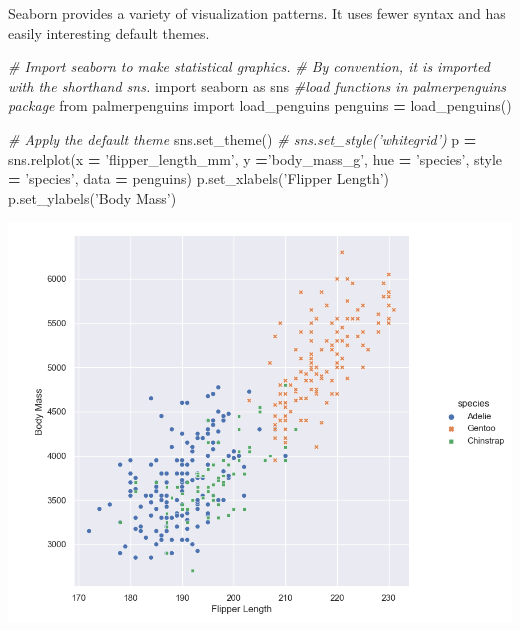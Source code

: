 \documentclass[]{book}
\newenvironment{Shaded}{\begin{snugshade}}{\end{snugshade}}
\newcommand{\CommentTok}[1]{\textcolor[rgb]{0.56,0.35,0.01}{\textit{#1}}}
\newcommand{\ImportTok}[1]{#1}
\newcommand{\NormalTok}[1]{#1}
\newcommand{\OperatorTok}[1]{\textcolor[rgb]{0.81,0.36,0.00}{\textbf{#1}}}
\newcommand{\StringTok}[1]{\textcolor[rgb]{0.31,0.60,0.02}{#1}}
\begin{document}
Seaborn provides a variety of visualization patterns. It uses fewer syntax and has easily interesting default themes.

\begin{Shaded}
\begin{Highlighting}[]
\CommentTok{# Import seaborn to make statistical graphics. }
\CommentTok{# By convention, it is imported with the shorthand sns.}
\ImportTok{import}\NormalTok{ seaborn }\ImportTok{as}\NormalTok{ sns }
\CommentTok{#load functions in palmerpenguins package}
\ImportTok{from}\NormalTok{ palmerpenguins }\ImportTok{import}\NormalTok{ load_penguins}
\NormalTok{penguins }\OperatorTok{=}\NormalTok{ load_penguins()}

\CommentTok{# Apply the default theme}
\NormalTok{sns.set_theme()}
\CommentTok{# sns.set_style('whitegrid')}
\NormalTok{p }\OperatorTok{=}\NormalTok{ sns.relplot(x }\OperatorTok{=} \StringTok{'flipper_length_mm'}\NormalTok{,}
\NormalTok{            y }\OperatorTok{=}\StringTok{'body_mass_g'}\NormalTok{,}
\NormalTok{            hue }\OperatorTok{=} \StringTok{'species'}\NormalTok{,}
\NormalTok{            style }\OperatorTok{=} \StringTok{'species'}\NormalTok{,}
\NormalTok{            data }\OperatorTok{=}\NormalTok{ penguins)}
\NormalTok{p.set_xlabels(}\StringTok{'Flipper Length'}\NormalTok{)}
\NormalTok{p.set_ylabels(}\StringTok{'Body Mass'}\NormalTok{)   }
\end{Highlighting}
\end{Shaded}

\begin{center}\includegraphics[width=0.9\linewidth]{fig/Viz_chap/2_seaborn} \end{center}
\end{document}
